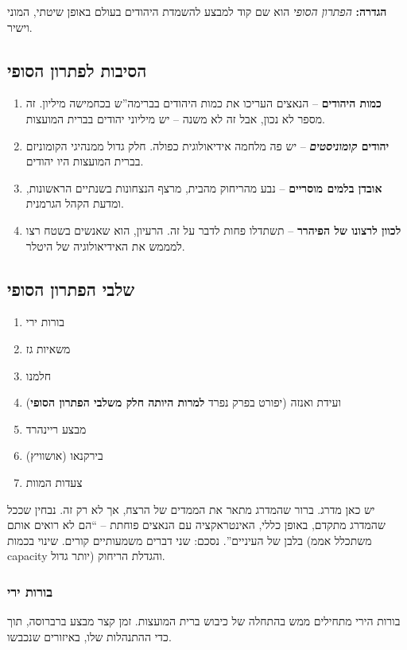 \documentclass[a4paper]{book}
\begin{document}
	\textbf{הגדרה: }{\textit{הפתרון הסופי} הוא שם קוד למבצע להשמדת היהודים בעולם באופן שיטתי, המוני וישיר. }
	
	\subsection{הסיבות לפתרון הסופי}
	\begin{enumerate}
		\item \textbf{כמות היהודים} – הנאצים העריכו את כמות היהודים בברימה''ש בכחמישה מיליון. זה מספר לא נכון, אבל זה לא משנה – יש מיליוני יהודים בברית המועצות. 
		\item \textbf{יהודים \textit{קומוניסטים}} – יש פה מלחמה אידיאולוגית כפולה. חלק גדול ממנהיגי הקומוניזם בברית המועצות היו יהודים. 
		\item \textbf{אובדן בלמים מוסריים} – נבע מהריחוק מהבית, מרצף הנצחונות בשנתיים הראשונות, ומדעת הקהל הגרמנית. 
		\item \textbf{לכוון לרצונו של הפיהרר} – תשתדלו פחות לדבר על זה. הרעיון, הוא שאנשים בשטח רצו למממש את האידיאולוגיה של היטלר. 
	\end{enumerate}
	
	\subsection{שלבי הפתרון הסופי}
	\begin{multicols}{2}
		\begin{enumerate}
			\item בורות ירי
			\item משאיות גז
			\item חלמנו
			\item ועידת ואנזה (יפורט בפרק נפרד \textbf{למרות היותה חלק משלבי הפתרון הסופי})
			\item מבצע ריינהרד
			\item בירקנאו (אושוויץ)
			\item צעדות המוות
		\end{enumerate}
	\end{multicols}
	יש כאן מדרג. ברור שהמדרג מתאר את הממדים של הרצח, אך לא רק זה. נבחין שככל שהמדרג מתקדם, באופן כללי, האינטראקציה עם הנאצים פוחתת – ``הם לא רואים אותם בלבן של העיניים''. נסכם: שני דברים משמעותיים קורים. שינוי בכמות (משתכלל אממ capacity יותר גדול) והגדלת הריחוק. 
	
	
	\subsubsection{בורות ירי}
	בורות הירי מתחילים ממש בהתחלה של כיבוש ברית המועצות. זמן קצר מבצע ברברוסה, תוך כדי ההתנהלות שלו, באיזורים שנכבשו. 
	
\end{document}
